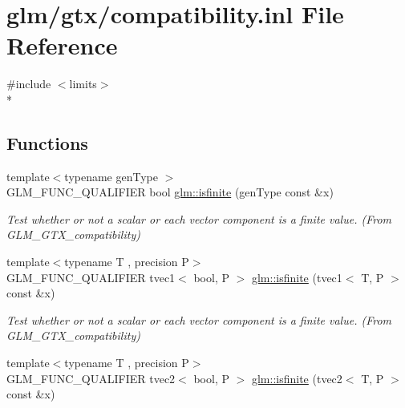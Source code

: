 \hypertarget{compatibility_8inl}{\section{glm/gtx/compatibility.inl File Reference}
\label{compatibility_8inl}
}
{\ttfamily \#include $<$limits$>$}\\*
\subsection*{Functions}
\begin{DoxyCompactItemize}
\item 
\hypertarget{group__gtx__compatibility_gaf4b04dcd3526996d68c1bfe17bfc8657}{{\footnotesize template$<$typename gen\-Type $>$ }\\G\-L\-M\-\_\-\-F\-U\-N\-C\-\_\-\-Q\-U\-A\-L\-I\-F\-I\-E\-R bool \hyperlink{group__gtx__compatibility_gaf4b04dcd3526996d68c1bfe17bfc8657}{glm\-::isfinite} (gen\-Type const \&x)}\label{group__gtx__compatibility_gaf4b04dcd3526996d68c1bfe17bfc8657}

\begin{DoxyCompactList}\small\item\em Test whether or not a scalar or each vector component is a finite value. (From G\-L\-M\-\_\-\-G\-T\-X\-\_\-compatibility) \end{DoxyCompactList}\item 
\hypertarget{group__gtx__compatibility_ga553e2e95b06a0f70c718605998889d3b}{{\footnotesize template$<$typename T , precision P$>$ }\\G\-L\-M\-\_\-\-F\-U\-N\-C\-\_\-\-Q\-U\-A\-L\-I\-F\-I\-E\-R tvec1$<$ bool, P $>$ \hyperlink{group__gtx__compatibility_ga553e2e95b06a0f70c718605998889d3b}{glm\-::isfinite} (tvec1$<$ T, P $>$ const \&x)}\label{group__gtx__compatibility_ga553e2e95b06a0f70c718605998889d3b}

\begin{DoxyCompactList}\small\item\em Test whether or not a scalar or each vector component is a finite value. (From G\-L\-M\-\_\-\-G\-T\-X\-\_\-compatibility) \end{DoxyCompactList}\item 
\hypertarget{group__gtx__compatibility_ga7dd492aa7d6ec21715f9a91b6e5e596a}{{\footnotesize template$<$typename T , precision P$>$ }\\G\-L\-M\-\_\-\-F\-U\-N\-C\-\_\-\-Q\-U\-A\-L\-I\-F\-I\-E\-R tvec2$<$ bool, P $>$ \hyperlink{group__gtx__compatibility_ga7dd492aa7d6ec21715f9a91b6e5e596a}{glm\-::isfinite} (tvec2$<$ T, P $>$ const \&x)}\label{group__gtx__compatibility_ga7dd492aa7d6ec21715f9a91b6e5e596a}


\end{DoxyCompactItemize}
